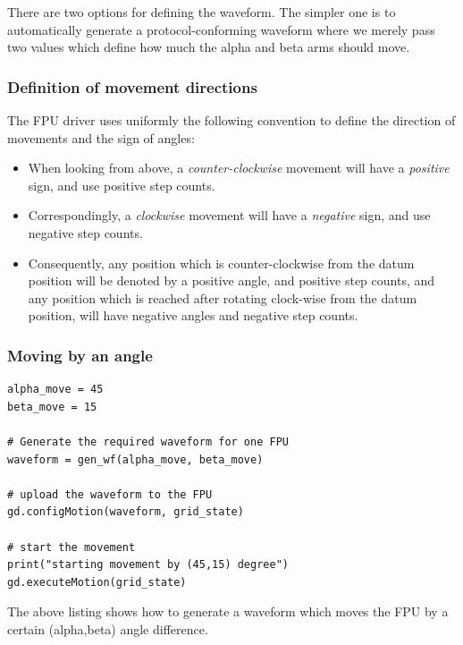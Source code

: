 \documentclass[11pt,a4paper]{report}
\begin{document}
There are two options for defining the waveform. The simpler one is to
automatically generate a protocol-conforming waveform where we merely
pass two values which define how much the alpha and beta arms should
move.

\subsubsection{Definition of movement directions}

The FPU driver uses uniformly the following convention
to define the direction of movements and the sign of
angles:

\begin{itemize}
  \item When looking from above, a \emph{counter-clockwise} movement
    will have a \emph{positive} sign, and use positive step counts.
  \item Correspondingly, a \emph{clockwise} movement will have a
    \emph{negative} sign, and use negative step counts.
  \item Consequently, any position which is counter-clockwise from the
    datum position will be denoted by a positive angle, and positive
    step counts, and any position which is reached after rotating
    clock-wise from the datum position, will have negative angles and
    negative step counts.
\end{itemize}

\subsubsection{Moving by an angle}
\begin{verbatim}
alpha_move = 45
beta_move = 15

# Generate the required waveform for one FPU
waveform = gen_wf(alpha_move, beta_move)

# upload the waveform to the FPU
gd.configMotion(waveform, grid_state)

# start the movement
print("starting movement by (45,15) degree")
gd.executeMotion(grid_state)
\end{verbatim}

The above listing shows how to generate a waveform which moves the FPU
by a certain (alpha,beta) angle difference.
\end{document}
